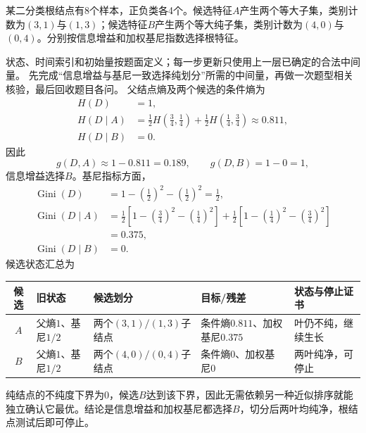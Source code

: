 \label{struct:V2-C04-CH32}
\begin{example}[信息增益与基尼一致选择纯划分]\label{exm:V2-C04-split-choice}
某二分类根结点有8个样本，正负类各4个。候选特征$A$产生两个等大子集，类别计数为$(3,1)$与$(1,3)$；候选特征$B$产生两个等大纯子集，类别计数为$(4,0)$与$(0,4)$。分别按信息增益和加权基尼指数选择根特征。

\label{struct:V2-C04-CH33}
\end{example}
\begin{solution}
\SolGiven 状态、时间索引和初始量按题面定义；每一步更新只使用上一层已确定的合法中间量。
\SolPlan 先完成“信息增益与基尼一致选择纯划分”所需的中间量，再做一次题型相关核验，最后回收题目各问。
\SolDerive
父结点熵及两个候选的条件熵为
\[
\begin{aligned}
H(D)&=1,\\
H(D\mid A)
&=\frac12H\!\left(\frac34,\frac14\right)
 +\frac12H\!\left(\frac14,\frac34\right)
\approx0.811,\\
H(D\mid B)&=0.
\end{aligned}
\]
因此
\[
g(D,A)\approx1-0.811=0.189,
\qquad
g(D,B)=1-0=1,
\]
信息增益选择$B$。基尼指标方面，
\[
\begin{aligned}
\operatorname{Gini}(D)&=1-\left(\frac12\right)^2-\left(\frac12\right)^2=\frac12,\\
\operatorname{Gini}(D\mid A)
&=\frac12\left[1-\left(\frac34\right)^2-\left(\frac14\right)^2\right]
 +\frac12\left[1-\left(\frac14\right)^2-\left(\frac34\right)^2\right]\\
&=0.375,\\
\operatorname{Gini}(D\mid B)&=0.
\end{aligned}
\]
候选状态汇总为
\begin{center}
\begin{tabularx}{\linewidth}{@{}c X X X X@{}}
\toprule
候选 & 旧状态 & 候选划分 & 目标/残差 & 状态与停止证书\\
\midrule
$A$ & 父熵$1$、基尼$1/2$ & 两个$(3,1)/(1,3)$子结点 & 条件熵$0.811$、加权基尼$0.375$ & 叶仍不纯，继续生长\\
$B$ & 父熵$1$、基尼$1/2$ & 两个$(4,0)/(0,4)$子结点 & 条件熵$0$、加权基尼$0$ & 两叶纯净，可停止\\
\bottomrule
\end{tabularx}
\end{center}
纯结点的不纯度下界为0，候选$B$达到该下界，因此无需依赖另一种近似排序就能独立确认它最优。结论是信息增益和加权基尼都选择$B$，切分后两叶均纯净，根结点测试后即可停止。
\end{solution}

